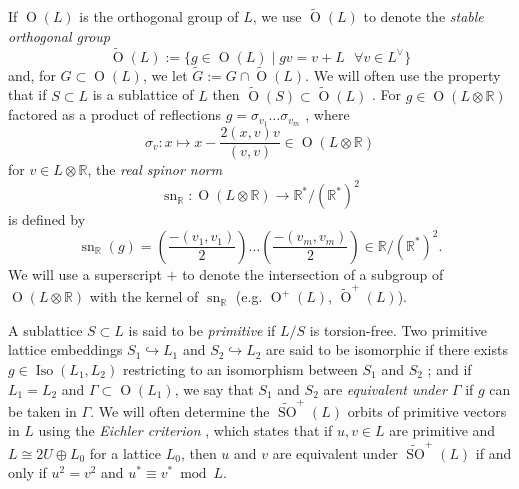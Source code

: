 \documentclass[12pt, a4paper]{article}
\newcommand{\RR}{\mathbb{R}}
\newcommand{\opn}{\operatorname}
\newcommand{\op}{\oplus}
\begin{document}
If $\opn{O}(L)$ is the orthogonal group of $L$, we use  $\widetilde{\opn{O}}(L)$ to denote the \emph{stable orthogonal group}
\[
  \widetilde{\opn{O}}(L) := \{ g \in \opn{O}(L) \mid \text{$gv = v + L$ $\forall v \in L^{\vee}$} \} 
  \]
  and, for $G \subset \opn{O}(L)$, we let $\widetilde{G} := G \cap \widetilde{\opn{O}}(L)$.
  We will often use the property that if $S \subset L$ is a sublattice of $L$ then $\widetilde{\opn{O}}(S) \subset \widetilde{\opn{O}}(L)$ \cite[Lemma 7.1]{Handbook}.  
For $g \in \opn{O}(L \otimes \RR)$ factored as a product of reflections $g = \sigma_{v_1} \ldots \sigma_{v_m}$ \cite{cassels}, where
\begin{equation}\label{refdef}
  \sigma_v : x \mapsto x - \frac{2(x,v)v}{(v,v)} \in \opn{O}(L \otimes \RR)
\end{equation}
for $v \in L \otimes \RR$,
the \emph{real spinor norm} \cite{kneser} 
\[
\opn{sn}_{\RR}: \opn{O}(L \otimes \RR) \rightarrow \RR^*/(\RR^*)^2
\]
is defined by 
\[
  \opn{sn}_{\RR}(g) =
  \left ( \frac{-(v_1, v_1)}{2} \right )
  \ldots
  \left ( \frac{-(v_m, v_m)}{2} \right )
  \in \RR / (\RR^*)^2.
\]
We will use a superscript $+$ to denote the intersection of a subgroup of $\opn{O}(L \otimes \RR)$ with the kernel of $\opn{sn}_{\RR}$ (e.g. $\opn{O}^+(L)$, $\widetilde{\opn{O}}^+(L)$).

A sublattice $S \subset L$ is said to be \emph{primitive} if $L/S$ is torsion-free.
Two primitive lattice embeddings  $S_1 \hookrightarrow L_1$ and $S_2 \hookrightarrow L_2$ are said to be isomorphic if there exists $g \in \opn{Iso}(L_1, L_2)$ restricting to an isomorphism between $S_1$ and $S_2$ \cite{Nikulin}; and if $L_1 = L_2$ and $\Gamma \subset \opn{O}(L_1)$, we say that $S_1$ and $S_2$ are \emph{equivalent under $\Gamma$} if $g$  can be taken in $\Gamma$.
We will often determine the $\widetilde{\opn{SO}}^+(L)$ orbits of primitive vectors in $L$ using the \emph{Eichler criterion} \cite[\S10]{Eichler} \cite[Proposition 3.3]{abelianisation}, which states that if $u, v \in L$ are primitive and $L \cong 2U \op L_0$ for a lattice $L_0$, then $u$ and $v$ are equivalent under $\widetilde{\opn{SO}}^+(L)$ if and only if $u^2=v^2$ and $u^* \equiv v^* \bmod{L}$. 
\end{document}

